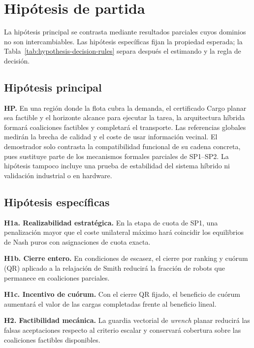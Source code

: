 \section{Hipótesis de partida}
\label{sec:hypotheses}

La hipótesis principal se contrasta mediante resultados parciales cuyos dominios
no son intercambiables. Las hipótesis específicas fijan la propiedad esperada;
la Tabla~\ref{tab:hypothesis-decision-rules} separa después el estimando y la regla
de decisión.

\subsection{Hipótesis principal}

\noindent\textbf{HP.}
En una región donde la flota cubra la demanda, el certificado Cargo planar sea
factible y el horizonte alcance para ejecutar la tarea, la arquitectura híbrida
formará coaliciones factibles y completará el transporte. Las referencias
globales medirán la brecha de calidad y el coste de usar información vecinal. El
demostrador solo contrasta la compatibilidad funcional de su cadena concreta,
pues sustituye parte de los mecanismos formales parciales de SP1--SP2. La hipótesis tampoco
incluye una prueba de estabilidad del sistema híbrido ni validación industrial o
en hardware.

\subsection{Hipótesis específicas}

\noindent\textbf{H1a. Realizabilidad estratégica.}
En la etapa de cuota de SP1, una penalización mayor que el coste unilateral
máximo hará coincidir los equilibrios de Nash puros con asignaciones de cuota
exacta.

\noindent\textbf{H1b. Cierre entero.}
En condiciones de escasez, el cierre por ranking y cuórum (QR) aplicado a la
relajación de Smith reducirá la fracción de robots que permanece en coaliciones
parciales.

\noindent\textbf{H1c. Incentivo de cuórum.}
Con el cierre QR fijado, el beneficio de cuórum aumentará el valor de las cargas
completadas frente al beneficio lineal.

\noindent\textbf{H2. Factibilidad mecánica.}
La guardia vectorial de \emph{wrench} planar reducirá las falsas aceptaciones
respecto al criterio escalar y conservará cobertura sobre las coaliciones
factibles disponibles.

